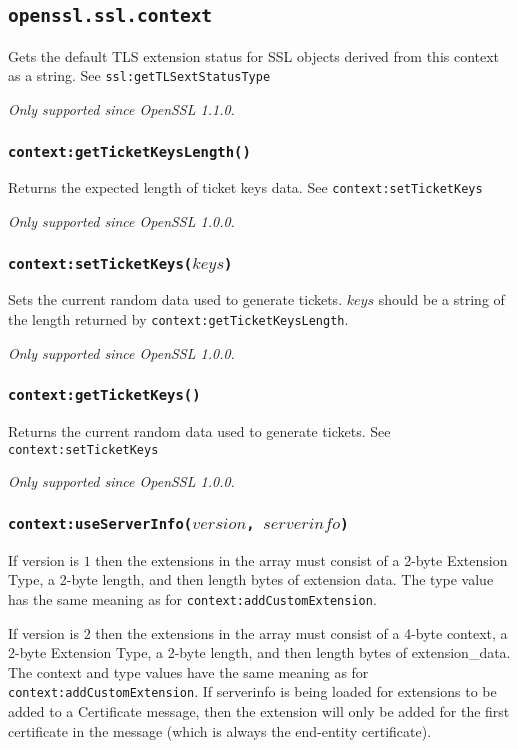 \documentclass[11pt, oneside]{memoir}
\newcommand*{\fn}[1]{\texttt{#1}\xspace}
\newcounter{toccols}
\newenvironment{Module}[1]{
	\subsection{\texttt{#1}}
	\addtocontents{toc}{
		\protect\begin{multicols}{\value{toccols}}
	}
}{
	\addtocontents{toc}{\protect\end{multicols}}
}
\begin{document}
\begin{Module}{openssl.ssl.context}
Gets the default TLS extension status for SSL objects derived from this context as a string.
See \fn{ssl:getTLSextStatusType}

\emph{Only supported since OpenSSL 1.1.0.}

\subsubsection[\fn{context:getTicketKeysLength}]{\fn{context:getTicketKeysLength()}}

Returns the expected length of ticket keys data.
See \fn{context:setTicketKeys}

\emph{Only supported since OpenSSL 1.0.0.}

\subsubsection[\fn{context:setTicketKeys}]{\fn{context:setTicketKeys($keys$)}}

Sets the current random data used to generate tickets. $keys$ should be a string of the length returned by \fn{context:getTicketKeysLength}.

\emph{Only supported since OpenSSL 1.0.0.}

\subsubsection[\fn{context:getTicketKeys}]{\fn{context:getTicketKeys()}}

Returns the current random data used to generate tickets.
See \fn{context:setTicketKeys}

\emph{Only supported since OpenSSL 1.0.0.}

\subsubsection[\fn{context:useServerInfo}]{\fn{context:useServerInfo($version$, $serverinfo$)}}

If version is $1$ then the extensions in the array must consist of a 2-byte Extension Type, a 2-byte length, and then length bytes of extension data. The type value has the same meaning as for \fn{context:addCustomExtension}.

If version is $2$ then the extensions in the array must consist of a 4-byte context, a 2-byte Extension Type, a 2-byte length, and then length bytes of extension\_data. The context and type values have the same meaning as for \fn{context:addCustomExtension}. If serverinfo is being loaded for extensions to be added to a Certificate message, then the extension will only be added for the first certificate in the message (which is always the end-entity certificate).


\end{Module}
\end{document}
